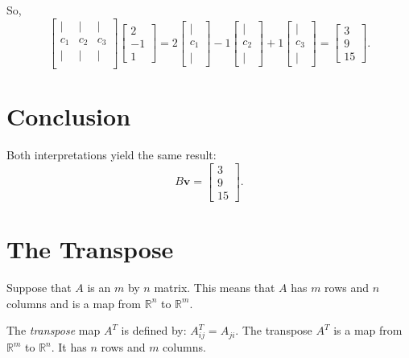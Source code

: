 \documentclass[11pt]{article}
\begin{document}
So,
\[
\begin{bmatrix}
| & | & | \\
c_1 & c_2 & c_3 \\
| & | & | \\
\end{bmatrix}
\begin{bmatrix}
2 \\ -1 \\ 1
\end{bmatrix}
=
2 \begin{bmatrix} | \\ c_1 \\ | \end{bmatrix}
- 1 \begin{bmatrix} | \\ c_2 \\ | \end{bmatrix}
+ 1 \begin{bmatrix} | \\ c_3 \\ | \end{bmatrix}
=
\begin{bmatrix}
3 \\ 9 \\ 15
\end{bmatrix}.
\]

\section*{Conclusion}

Both interpretations yield the same result:
\[
B\mathbf{v} = \begin{bmatrix} 3 \\ 9 \\ 15 \end{bmatrix}.
\]



\section{The Transpose}

Suppose that $A$ is an $m$ by $n$ matrix. This means that $A$ has $m$ rows and $n$ columns and is a map from $\mathbb{R}^n$ to $\mathbb{R}^m$. 

The \emph{transpose} map $A^T$ is defined by: $A^T_{ij} = A_{ji}$. The transpose $A^T$ is a map from $\mathbb{R}^m$ to $\mathbb{R}^n$. It has $n$ rows and $m$ columns. 
\end{document}
